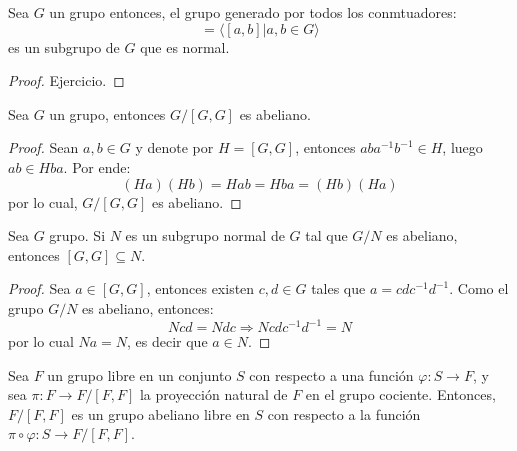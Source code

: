\documentclass[12pt]{report}
\theoremstyle{largebreak}
\newcommand\cf[3]{\ensuremath{#1:#2\rightarrow#3}}
\begin{document}
    \begin{propo}
        Sea $G$ un grupo entonces, el grupo generado por todos los conmtuadores:
        \begin{equation*}
            [G,G]=\langle[a,b]\Big|a,b\in G \rangle
        \end{equation*}
        es un subgrupo de $G$ que es normal.
    \end{propo}

    \begin{proof}
        Ejercicio.
    \end{proof}

    \begin{propo}
        Sea $G$ un grupo, entonces $G/[G,G]$ es abeliano.
    \end{propo}

    \begin{proof}
        Sean $a,b\in G$ y denote por $H=[G,G]$, entonces $aba^{-1}b^{-1}\in H$, luego $ab\in Hba$. Por ende:
        \begin{equation*}
            (Ha)(Hb)=Hab=Hba=(Hb)(Ha)
        \end{equation*}
        por lo cual, $G/[G,G]$ es abeliano.
    \end{proof}

    \begin{propo}
        Sea $G$ grupo. Si $N$ es un subgrupo normal de $G$ tal que $G/N$ es abeliano, entonces $[G,G]\subseteq N$.
    \end{propo}

    \begin{proof}
        Sea $a\in[G,G]$, entonces existen $c,d\in G$ tales que $a=cdc^{-1}d^{-1}$. Como el grupo $G/N$ es abeliano, entonces:
        \begin{equation*}
            Ncd=Ndc\Rightarrow Ncdc^{-1}d^{-1}=N
        \end{equation*}
        por lo cual $Na=N$, es decir que $a\in N$.
    \end{proof}

    \begin{propo}
        Sea $F$ un grupo libre en un conjunto $S$ con respecto a una función $\cf{\varphi}{S}{F}$, y sea $\cf{\pi}{F}{F/[F,F]}$ la proyección natural de $F$ en el grupo cociente. Entonces, $F/[F,F]$ es un grupo abeliano libre en $S$ con respecto a la función $\cf{\pi\circ\varphi}{S}{F/[F,F]}$.
    \end{propo}
\end{document}
